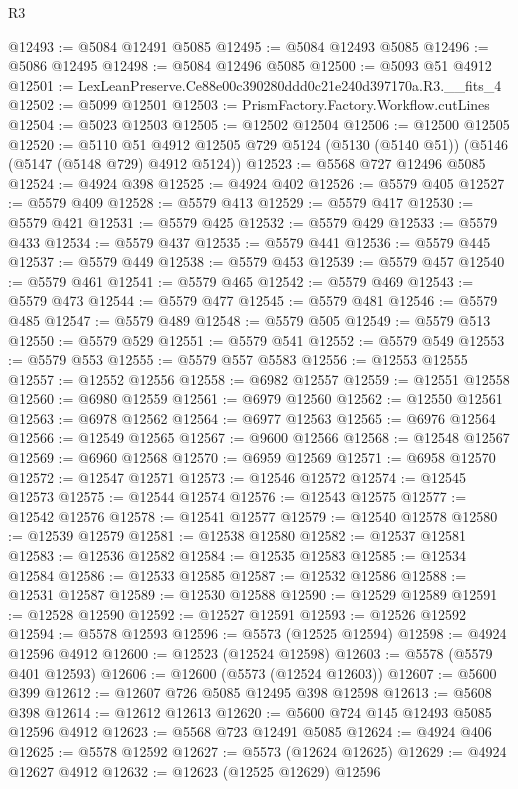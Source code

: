 \begin{lexlean}{R3}
\begin{coremodule}
@12493 := @5084 @12491 @5085
@12495 := @5084 @12493 @5085
@12496 := @5086 @12495
@12498 := @5084 @12496 @5085
@12500 := @5093 @51 @4912
@12501 := LexLeanPreserve.Ce88e00c390280ddd0c21e240d397170a.R3.__fits_4
@12502 := @5099 @12501
@12503 := PrismFactory.Factory.Workflow.cutLines
@12504 := @5023 @12503
@12505 := @12502 @12504
@12506 := @12500 @12505
@12520 := @5110
    @51
    @4912
    @12505
    @729
    @5124
    (@5130 (@5140 @51))
    (@5146 (@5147 (@5148 @729) @4912 @5124))
@12523 := @5568 @727 @12496 @5085
@12524 := @4924 @398
@12525 := @4924 @402
@12526 := @5579 @405
@12527 := @5579 @409
@12528 := @5579 @413
@12529 := @5579 @417
@12530 := @5579 @421
@12531 := @5579 @425
@12532 := @5579 @429
@12533 := @5579 @433
@12534 := @5579 @437
@12535 := @5579 @441
@12536 := @5579 @445
@12537 := @5579 @449
@12538 := @5579 @453
@12539 := @5579 @457
@12540 := @5579 @461
@12541 := @5579 @465
@12542 := @5579 @469
@12543 := @5579 @473
@12544 := @5579 @477
@12545 := @5579 @481
@12546 := @5579 @485
@12547 := @5579 @489
@12548 := @5579 @505
@12549 := @5579 @513
@12550 := @5579 @529
@12551 := @5579 @541
@12552 := @5579 @549
@12553 := @5579 @553
@12555 := @5579 @557 @5583
@12556 := @12553 @12555
@12557 := @12552 @12556
@12558 := @6982 @12557
@12559 := @12551 @12558
@12560 := @6980 @12559
@12561 := @6979 @12560
@12562 := @12550 @12561
@12563 := @6978 @12562
@12564 := @6977 @12563
@12565 := @6976 @12564
@12566 := @12549 @12565
@12567 := @9600 @12566
@12568 := @12548 @12567
@12569 := @6960 @12568
@12570 := @6959 @12569
@12571 := @6958 @12570
@12572 := @12547 @12571
@12573 := @12546 @12572
@12574 := @12545 @12573
@12575 := @12544 @12574
@12576 := @12543 @12575
@12577 := @12542 @12576
@12578 := @12541 @12577
@12579 := @12540 @12578
@12580 := @12539 @12579
@12581 := @12538 @12580
@12582 := @12537 @12581
@12583 := @12536 @12582
@12584 := @12535 @12583
@12585 := @12534 @12584
@12586 := @12533 @12585
@12587 := @12532 @12586
@12588 := @12531 @12587
@12589 := @12530 @12588
@12590 := @12529 @12589
@12591 := @12528 @12590
@12592 := @12527 @12591
@12593 := @12526 @12592
@12594 := @5578 @12593
@12596 := @5573 (@12525 @12594)
@12598 := @4924 @12596 @4912
@12600 := @12523 (@12524 @12598)
@12603 := @5578 (@5579 @401 @12593)
@12606 := @12600 (@5573 (@12524 @12603))
@12607 := @5600 @399
@12612 := @12607 @726 @5085 @12495 @398 @12598
@12613 := @5608 @398
@12614 := @12612 @12613
@12620 := @5600 @724 @145 @12493 @5085 @12596 @4912
@12623 := @5568 @723 @12491 @5085
@12624 := @4924 @406
@12625 := @5578 @12592
@12627 := @5573 (@12624 @12625)
@12629 := @4924 @12627 @4912
@12632 := @12623 (@12525 @12629) @12596

\end{coremodule}
\end{lexlean}
